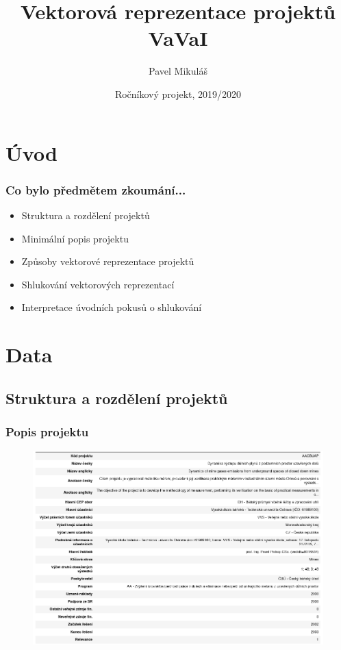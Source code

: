 \documentclass{beamer}
\title{Vektorová reprezentace projektů VaVaI}
\author{Pavel Mikuláš}
\institute[MFF UK]%
{
  \inst{}%
  Matematicko-fyzikální fakulta\\
  Univerzita Karlova
}
\date{Ročníkový projekt, 2019/2020}
\begin{document}
\maketitle

\section{Úvod}


\begin{frame}
\frametitle{Co bylo předmětem zkoumání...}

  \begin{itemize}
    \item Struktura a rozdělení projektů \pause
    \item Minimální popis projektu \pause
    \item Způsoby vektorové reprezentace projektů \pause
    \item Shlukování vektorových reprezentací \pause
    \item Interpretace úvodních pokusů o shlukování
  \end{itemize}

\end{frame}

\section{Data}
\subsection{Struktura a rozdělení projektů}

\begin{frame}
  \frametitle{Popis projektu}

  \begin{figure}[!h]
      \centering
      \includegraphics[width=.85\textwidth,height=\textheight,keepaspectratio]{figures/complete_rep.png}
      \label{fig:complete_rep}
  \end{figure}
\end{frame}
\end{document}
